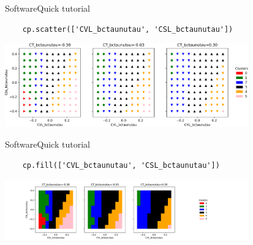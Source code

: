 \begin{frame}[fragile, t]{Software}{Quick tutorial}
\vspace{0.75cm}
\begin{verbatim}
    cp.scatter(['CVL_bctaunutau', 'CSL_bctaunutau'])
\end{verbatim}
\vspace{0.2cm}
\centering
\includegraphics[width=10.5cm]{figures/plots/2dpoints.pdf}
\end{frame}

\begin{frame}[fragile, t]{Software}{Quick tutorial}
\vspace{0.75cm}
\begin{verbatim}
    cp.fill(['CVL_bctaunutau', 'CSL_bctaunutau'])
\end{verbatim}
\centering
\includegraphics[trim=3cm 0 11cm 0, clip, width=10.5cm]{figures/plots/2dfill.pdf}
\end{frame}

